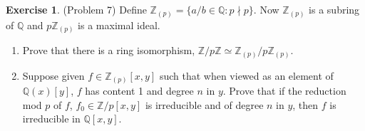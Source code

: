 \documentclass[12pt, psamsfonts]{amsart}
\theoremstyle{definition}
\newtheorem*{exer}{Exercise}
\theoremstyle{remark}
\numberwithin{equation}{section}
\begin{document}
\begin{exer}{(Problem 7)}
  Define $\mathbb{Z}_{(p)} = \{ a / b \in \mathbb{Q} : p \nmid p \}$.
  Now $\mathbb{Z}_{(p)}$ is a subring of $\mathbb{Q}$ and $p\mathbb{Z}_{(p)}$ is a maximal ideal.
  \begin{enumerate}[label=(\roman*)]
    \item
      Prove that there is a ring isomorphism, $\mathbb{Z}/p\mathbb{Z} \simeq \mathbb{Z}_{(p)} / p\mathbb{Z}_{(p)}$.
    \item
      Suppose given $f \in \mathbb{Z}_{(p)}[x, y]$ such that when viewed as an element of $\mathbb{Q}(x)[y]$, $f$ has content 1 and degree $n$ in $y$.
      Prove that if the reduction mod $p$ of $f$, $f_0 \in \mathbb{Z}/p[x, y]$ is irreducible and of degree $n$ in $y$, then $f$ is irreducible in $\mathbb{Q}[x, y]$.
  \end{enumerate}
\end{exer}
\end{document}
